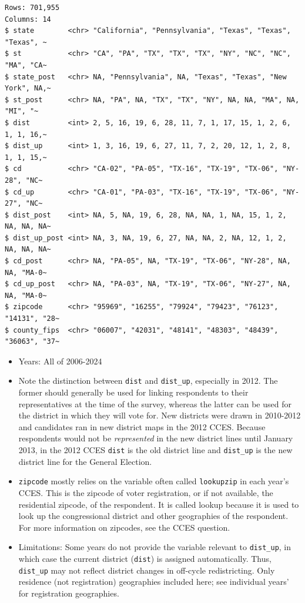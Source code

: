 \documentclass[10pt,article,oneside]{memoir}
\begin{document}
\begin{verbatim}
Rows: 701,955
Columns: 14
$ state        <chr> "California", "Pennsylvania", "Texas", "Texas", "Texas", ~
$ st           <chr> "CA", "PA", "TX", "TX", "TX", "NY", "NC", "NC", "MA", "CA~
$ state_post   <chr> NA, "Pennsylvania", NA, "Texas", "Texas", "New York", NA,~
$ st_post      <chr> NA, "PA", NA, "TX", "TX", "NY", NA, NA, "MA", NA, "MI", "~
$ dist         <int> 2, 5, 16, 19, 6, 28, 11, 7, 1, 17, 15, 1, 2, 6, 1, 1, 16,~
$ dist_up      <int> 1, 3, 16, 19, 6, 27, 11, 7, 2, 20, 12, 1, 2, 8, 1, 1, 15,~
$ cd           <chr> "CA-02", "PA-05", "TX-16", "TX-19", "TX-06", "NY-28", "NC~
$ cd_up        <chr> "CA-01", "PA-03", "TX-16", "TX-19", "TX-06", "NY-27", "NC~
$ dist_post    <int> NA, 5, NA, 19, 6, 28, NA, NA, 1, NA, 15, 1, 2, NA, NA, NA~
$ dist_up_post <int> NA, 3, NA, 19, 6, 27, NA, NA, 2, NA, 12, 1, 2, NA, NA, NA~
$ cd_post      <chr> NA, "PA-05", NA, "TX-19", "TX-06", "NY-28", NA, NA, "MA-0~
$ cd_up_post   <chr> NA, "PA-03", NA, "TX-19", "TX-06", "NY-27", NA, NA, "MA-0~
$ zipcode      <chr> "95969", "16255", "79924", "79423", "76123", "14131", "28~
$ county_fips  <chr> "06007", "42031", "48141", "48303", "48439", "36063", "37~
\end{verbatim}

\begin{itemize}
\tightlist
\item
  Years: All of 2006-2024
\item
  Note the distinction between \texttt{dist} and \texttt{dist\_up},
  especially in 2012. The former should generally be used for linking
  respondents to their representatives at the time of the survey,
  whereas the latter can be used for the district in which they will
  vote for. New districts were drawn in 2010-2012 and candidates ran in
  new district maps in the 2012 CCES. Because respondents would not be
  \emph{represented} in the new district lines until January 2013, in
  the 2012 CCES \texttt{dist} is the old district line and
  \texttt{dist\_up} is the new district line for the General Election.
\item
  \texttt{zipcode} mostly relies on the variable often called
  \texttt{lookupzip} in each year's CCES. This is the zipcode of voter
  registration, or if not available, the residential zipcode, of the
  respondent. It is called lookup because it is used to look up the
  congressional district and other geographies of the respondent. For
  more information on zipcodes, see the CCES question.
\item
  Limitations: Some years do not provide the variable relevant to
  \texttt{dist\_up}, in which case the current district (\texttt{dist})
  is assigned automatically. Thus, \texttt{dist\_up} may not reflect
  district changes in off-cycle redistricting. Only residence (not
  registration) geographies included here; see individual years' for
  registration geographies.
\end{itemize}
\end{document}
